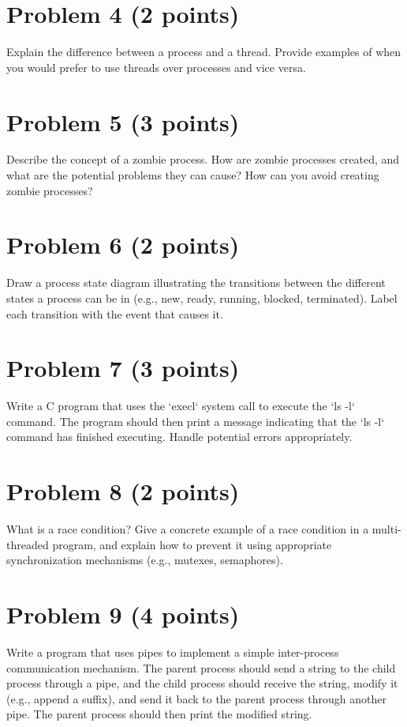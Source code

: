 \documentclass{article}
\begin{document}
\section*{Problem 4 (2 points)}

Explain the difference between a process and a thread.  Provide examples of when you would prefer to use threads over processes and vice versa.


\section*{Problem 5 (3 points)}

Describe the concept of a zombie process. How are zombie processes created, and what are the potential problems they can cause?  How can you avoid creating zombie processes?


\section*{Problem 6 (2 points)}

Draw a process state diagram illustrating the transitions between the different states a process can be in (e.g., new, ready, running, blocked, terminated).  Label each transition with the event that causes it.


\section*{Problem 7 (3 points)}

Write a C program that uses the `execl` system call to execute the `ls -l` command.  The program should then print a message indicating that the `ls -l` command has finished executing.  Handle potential errors appropriately.


\section*{Problem 8 (2 points)}

What is a race condition?  Give a concrete example of a race condition in a multi-threaded program, and explain how to prevent it using appropriate synchronization mechanisms (e.g., mutexes, semaphores).


\section*{Problem 9 (4 points)}

Write a program that uses pipes to implement a simple inter-process communication mechanism. The parent process should send a string to the child process through a pipe, and the child process should receive the string, modify it (e.g., append a suffix), and send it back to the parent process through another pipe. The parent process should then print the modified string.
\end{document}
